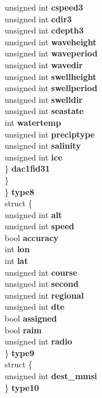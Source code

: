 \begin{DoxyCompactItemize}
{\begin{tabbing}
{\>\>\>\>unsigned int {\bfseries cspeed3}\\
\>\>\>\>unsigned int {\bfseries cdir3}\\
\>\>\>\>unsigned int {\bfseries cdepth3}\\
\>\>\>\>unsigned int {\bfseries waveheight}\\
\>\>\>\>unsigned int {\bfseries waveperiod}\\
\>\>\>\>unsigned int {\bfseries wavedir}\\
\>\>\>\>unsigned int {\bfseries swellheight}\\
\>\>\>\>unsigned int {\bfseries swellperiod}\\
\>\>\>\>unsigned int {\bfseries swelldir}\\
\>\>\>\>unsigned int {\bfseries seastate}\\
\>\>\>\>int {\bfseries watertemp}\\
\>\>\>\>unsigned int {\bfseries preciptype}\\
\>\>\>\>unsigned int {\bfseries salinity}\\
\>\>\>\>unsigned int {\bfseries ice}\\
\>\>\>\} {\bfseries dac1fid31}\\
\>\>\} }\label{structais__t_1_1@34_1_1@41_a95a8a21e0e94ba959b16eefdc959ab89}
\\
\>\} {\bfseries type8}\\
\>struct \{\\
\>\>unsigned int {\bfseries alt}\\
\>\>unsigned int {\bfseries speed}\\
\>\>bool {\bfseries accuracy}\\
\>\>int {\bfseries lon}\\
\>\>int {\bfseries lat}\\
\>\>unsigned int {\bfseries course}\\
\>\>unsigned int {\bfseries second}\\
\>\>unsigned int {\bfseries regional}\\
\>\>unsigned int {\bfseries dte}\\
\>\>bool {\bfseries assigned}\\
\>\>bool {\bfseries raim}\\
\>\>unsigned int {\bfseries radio}\\
\>\} {\bfseries type9}\\
\>struct \{\\
\>\>unsigned int {\bfseries dest\_mmsi}\\
\>\} {\bfseries type10}\\

\end{tabbing}}
\end{DoxyCompactItemize}
